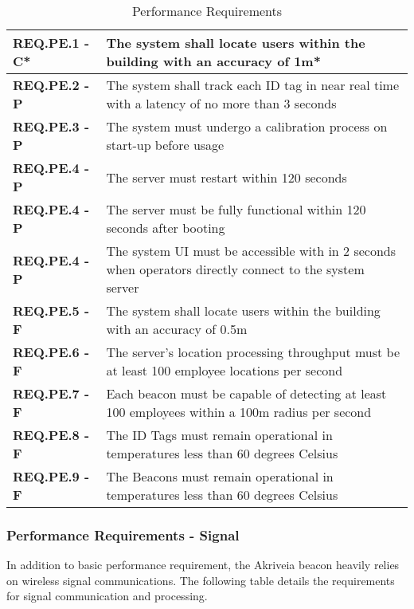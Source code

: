 \bigskip
\bgroup
\def\arraystretch{1.5}
\begin{table}[H]
\centering
\begin{tabular}{ | m{3.5cm} | m{12.5cm} |}
 \hline
 \textbf{REQ.PE.1 - C*} & The system shall locate users within the building with an accuracy of 1m* \\
\hline
 \textbf{REQ.PE.2 - P} & The system shall track each ID tag in near real time with a latency of no more than 3 seconds \\
\hline
 \textbf{REQ.PE.3 - P} & The system must undergo a calibration process on start-up before usage \\
\hline
 \textbf{REQ.PE.4 - P} & The server must restart within 120 seconds \\
\hline
 \textbf{REQ.PE.4 - P} & The server must be fully functional within 120 seconds after booting \\
\hline
 \textbf{REQ.PE.4 - P} & The system UI must be accessible with in 2 seconds when operators directly connect to the system server \\
\hline
 \textbf{REQ.PE.5 - F} & The system shall locate users within the building with an accuracy of 0.5m \\
\hline
 \textbf{REQ.PE.6 - F} & The server's location processing throughput must be at least 100 employee locations per second \\
\hline
 \textbf{REQ.PE.7 - F} & Each beacon must be capable of detecting at least 100 employees within a 100m radius per second \\
\hline
 \textbf{REQ.PE.8 - F} & The ID Tags must remain operational in temperatures less than 60 degrees Celsius \\
\hline
 \textbf{REQ.PE.9 - F} & The Beacons must remain operational in temperatures less than 60 degrees Celsius \\
\hline
\end{tabular}
\caption{Performance Requirements}
\end{table}

\break

\subsubsection{Performance Requirements - Signal}
In addition to basic performance requirement, the Akriveia beacon heavily relies on wireless signal communications. The following table details the requirements for signal communication and processing.
\bigskip

